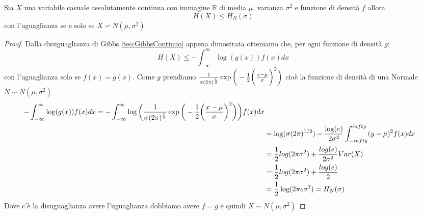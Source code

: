 \begin{teo}
Sia $X$ una variabile casuale assolutamente continua con immagine $\mathbb{R}$ di media $\mu$, varianza $\sigma^2$ e funzione di densità $f$ allora
$$H(X) \leq H_N(\sigma)$$
con l'uguaglianza se e solo se $X\backsim N(\mu,\sigma^2)$
\end{teo}
\begin{proof}
Dalla disuguaglianza di Gibbs \ref{teo:GibbsContinuo} appena dimostrata otteniamo che, per ogni funzione di densità $g$:
$$H(X)\leq - \int_{-\infty}^\infty \log (g(x))f(x)dx$$
con l'uguaglianza solo se $f(x)=g(x)$.
Come $g$ prendiamo $\frac{1}{\sigma (2\pi)^{\frac{1}{2}}} \exp \bigg( - \frac{1}{2} \bigg( \frac{x-\mu}{ \sigma} \bigg)^2 \bigg)$ cioè la funzione di densità di una Normale $N\backsim N(\mu, \sigma^2)$
\[
\begin{split}
- \int_{-\infty}^\infty \log (g(x))f(x)dx = - \int_{-\infty}^\infty \log \bigg( \frac{1}{\sigma (2\pi)^{\frac{1}{2}}} \exp \bigg( - \frac{1}{2} \bigg( \frac{x-\mu}{ \sigma} \bigg)^2 \bigg)\bigg)f(x)dx\\
&= \log(\sigma(2\pi)^{1/2})- \frac{\log(e)}{2\sigma^2}\int_{-infty}^{infty} (y-\mu)^2f(x)dx \\
&= \frac{1}{2}log(2\pi \sigma^2)+ \frac{log(e)}{2\sigma^2} Var(X)\\
&=\frac{1}{2}log(2\pi \sigma^2)+ \frac{log(e)}{2}\\
&=\frac{1}{2} \log(2\pi e \sigma^2)=H_N(\sigma)
\end{split}
\]
Dove c'è la disuguaglianza avere l'uguaglianza dobbiamo avere $f=g$ e quindi $X\backsim N(\mu,\sigma^2)$
\end{proof}













